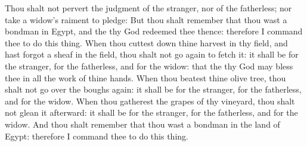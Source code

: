 \begin{biblechapter}
\verse Thou shalt not pervert the judgment of the stranger, nor of the fatherless; nor take a widow's raiment to pledge:
\verse But thou shalt remember that thou wast a bondman in Egypt, and the \LORD thy God redeemed thee thence: therefore I command thee to do this thing.
\verse When thou cuttest down thine harvest in thy field, and hast forgot a sheaf in the field, thou shalt not go again to fetch it: it shall be for the stranger, for the fatherless, and for the widow: that the \LORD thy God may bless thee in all the work of thine hands.
\verse When thou beatest thine olive tree, thou shalt not go over the boughs again: it shall be for the stranger, for the fatherless, and for the widow.
\verse When thou gatherest the grapes of thy vineyard, thou shalt not glean it afterward: it shall be for the stranger, for the fatherless, and for the widow.
\verse And thou shalt remember that thou wast a bondman in the land of Egypt: therefore I command thee to do this thing.
\end{biblechapter}

